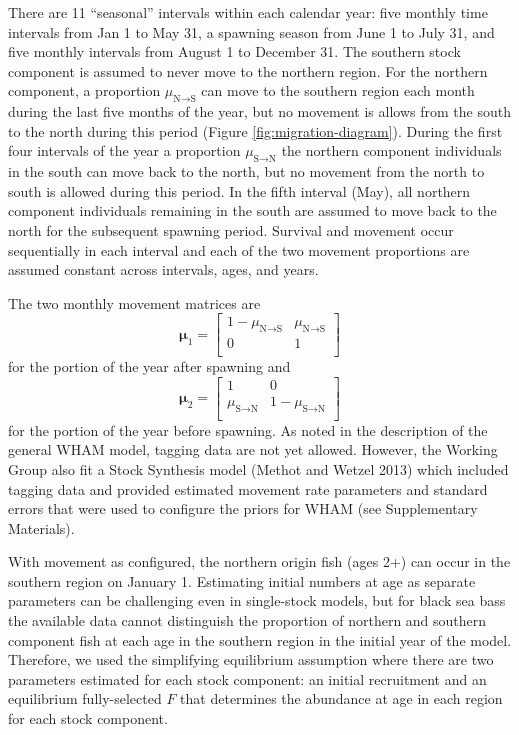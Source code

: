 \documentclass[
]{article}
\begin{document}
There are 11 ``seasonal'' intervals within each calendar year: five
monthly time intervals from Jan 1 to May 31, a spawning season from June
1 to July 31, and five monthly intervals from August 1 to December 31.
The southern stock component is assumed to never move to the northern
region. For the northern component, a proportion
\(\mu_{\text{N}\rightarrow \text{S}}\) can move to the southern region
each month during the last five months of the year, but no movement is
allows from the south to the north during this period (Figure
\ref{fig:migration-diagram}). During the first four intervals of the
year a proportion \(\mu_{\text{S}\rightarrow \text{N}}\) the northern
component individuals in the south can move back to the north, but no
movement from the north to south is allowed during this period. In the
fifth interval (May), all northern component individuals remaining in
the south are assumed to move back to the north for the subsequent
spawning period. Survival and movement occur sequentially in each
interval and each of the two movement proportions are assumed constant
across intervals, ages, and years.

The two monthly movement matrices are \begin{equation*}
\boldsymbol{\mu}_{1} = 
  \begin{bmatrix}
     1-\mu_{\text{N}\rightarrow \text{S}} & \mu_{\text{N}\rightarrow \text{S}} \\
     0 & 1 \\
  \end{bmatrix}
\end{equation*} for the portion of the year after spawning and
\begin{equation*}
\boldsymbol{\mu}_{2} = 
  \begin{bmatrix}
     1 &  0 \\
     \mu_{\text{S}\rightarrow \text{N}} & 1-\mu_{\text{S}\rightarrow \text{N}} \\
  \end{bmatrix}
\end{equation*} for the portion of the year before spawning. As noted in
the description of the general WHAM model, tagging data are not yet
allowed. However, the Working Group also fit a Stock Synthesis model
(Methot and Wetzel 2013) which included tagging data and provided
estimated movement rate parameters and standard errors that were used to
configure the priors for WHAM (see Supplementary Materials).

With movement as configured, the northern origin fish (ages 2+) can
occur in the southern region on January 1. Estimating initial numbers at
age as separate parameters can be challenging even in single-stock
models, but for black sea bass the available data cannot distinguish the
proportion of northern and southern component fish at each age in the
southern region in the initial year of the model. Therefore, we used the
simplifying equilibrium assumption where there are two parameters
estimated for each stock component: an initial recruitment and an
equilibrium fully-selected \(F\) that determines the abundance at age in
each region for each stock component.
\end{document}
